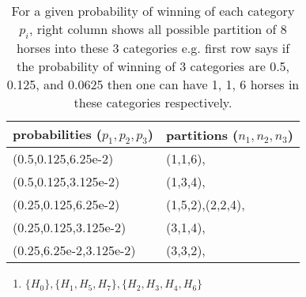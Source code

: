 \documentclass[a4paper,10pt]{article}
\begin{document}
\begin{table}[h]
    \centering
\begin{tabular}{l l}
    \hline
    probabilities ($p_1,p_2,p_3$)& partitions ($n_1,n_2,n_3$) \\
    \hline 
    (0.5,0.125,6.25e-2) & (1,1,6), \\
    (0.5,0.125,3.125e-2) & (1,3,4), \\
    (0.25,0.125,6.25e-2) & (1,5,2),(2,2,4), \\
    (0.25,0.125,3.125e-2) & (3,1,4), \\ 
    (0.25,6.25e-2,3.125e-2) & (3,3,2), \\
    \hline
\end{tabular}
\caption{For a given probability of winning of each category $p_i$, right column
    shows all possible partition of 8 horses into these 3 categories e.g. first
    row says if the probability of winning of 3 categories are 0.5, 0.125, and
0.0625 then one can have 1, 1, 6 horses in these categories respectively.}
\end{table}

\begin{enumerate}
    \item $ \{ H_0 \}, \{ H_1, H_5, H_7 \}, \{ H_2, H_3, H_4, H_6 \} $
\end{enumerate}

\begin{appendix}
\label{listing:a}



\end{appendix}
\end{document}
